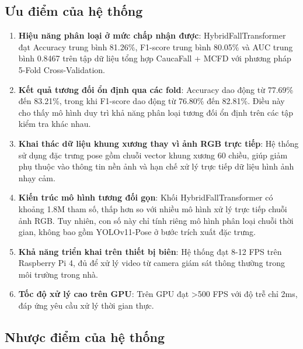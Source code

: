 \subsection{Ưu điểm của hệ thống}

\begin{enumerate}
    \item \textbf{Hiệu năng phân loại ở mức chấp nhận được}: HybridFallTransformer đạt Accuracy trung bình 81.26\%, F1-score trung bình 80.05\% và AUC trung bình 0.8467 trên tập dữ liệu tổng hợp CaucaFall + MCFD với phương pháp 5-Fold Cross-Validation.
    
    \item \textbf{Kết quả tương đối ổn định qua các fold}: Accuracy dao động từ 77.69\% đến 83.21\%, trong khi F1-score dao động từ 76.80\% đến 82.81\%. Điều này cho thấy mô hình duy trì khả năng phân loại tương đối ổn định trên các tập kiểm tra khác nhau.
    
    \item \textbf{Khai thác dữ liệu khung xương thay vì ảnh RGB trực tiếp}: Hệ thống sử dụng đặc trưng pose gồm chuỗi vector khung xương 60 chiều, giúp giảm phụ thuộc vào thông tin nền ảnh và hạn chế xử lý trực tiếp dữ liệu hình ảnh nhạy cảm.
    
    \item \textbf{Kiến trúc mô hình tương đối gọn}: Khối HybridFallTransformer có khoảng 1.8M tham số, thấp hơn so với nhiều mô hình xử lý trực tiếp chuỗi ảnh RGB. Tuy nhiên, con số này chỉ tính riêng mô hình phân loại chuỗi thời gian, không bao gồm YOLOv11-Pose ở bước trích xuất đặc trưng.
    
    \item \textbf{Khả năng triển khai trên thiết bị biên}: Hệ thống đạt 8-12 FPS trên Raspberry Pi 4, đủ để xử lý video từ camera giám sát thông thường trong môi trường trong nhà.
    
    \item \textbf{Tốc độ xử lý cao trên GPU}: Trên GPU đạt >500 FPS với độ trễ chỉ 2ms, đáp ứng yêu cầu xử lý thời gian thực.
\end{enumerate}

\subsection{Nhược điểm của hệ thống}

